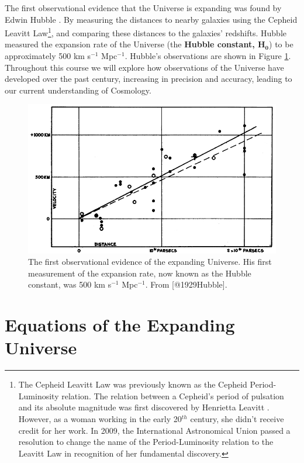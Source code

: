 \documentclass[]{book}
\let\rmarkdownfootnote\footnote%
\def\footnote{\protect\rmarkdownfootnote}
\begin{document}
The first observational evidence that the Universe is expanding was
found by Edwin Hubble \citep{1929Hubble}. By measuring the distances to
nearby galaxies using the Cepheid Leavitt Law\footnote{The Cepheid
  Leavitt Law was previously known as the Cepheid Period-Luminosity
  relation. The relation between a Cepheid's period of pulsation and its
  absolute magnitude was first discovered by Henrietta Leavitt
  \citep{1912Leavitt}. However, as a woman working in the early
  20\(^{th}\) century, she didn't receive credit for her work. In 2009,
  the International Astronomical Union passed a resolution to change the
  name of the Period-Luminosity relation to the Leavitt Law in
  recognition of her fundamental discovery.}, and comparing these
distances to the galaxies' redshifts. Hubble measured the expansion rate
of the Universe (the \textbf{Hubble constant, \(\mathbf{H_0}\)}) to be
approximately 500 km s\(^{-1}\) Mpc\(^{-1}\). Hubble's observations are
shown in Figure \ref{fig:hubble-h0-diagram}. Throughout this course we
will explore how observations of the Universe have developed over the
past century, increasing in precision and accuracy, leading to our
current understanding of Cosmology.

\begin{figure}
\includegraphics[width=1\linewidth]{Images/hubble-diagram} \caption{The first observational evidence of the expanding Universe. His first measurement of the expansion rate, now known as the Hubble constant, was 500 km s$^{-1}$ Mpc$^{-1}$. From [@1929Hubble].}\label{fig:hubble-h0-diagram}
\end{figure}

\chapter{Equations of the Expanding Universe}\label{ch:eqs_of_expanding}
\end{document}
